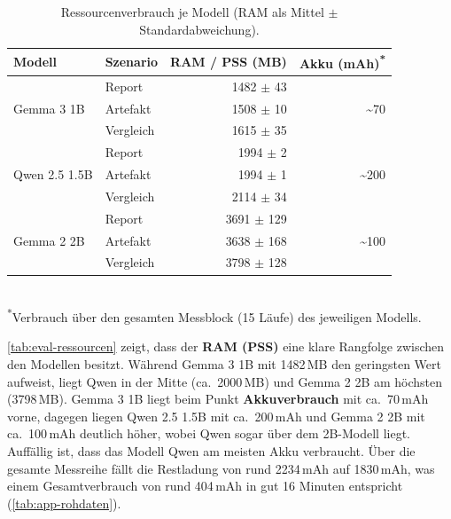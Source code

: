 \begin{table}[H]
    \centering
    \caption{Ressourcenverbrauch je Modell (RAM als Mittel $\pm$ Standardabweichung).}
    \label{tab:eval-ressourcen}
    \begin{tabular}{llrr}
        \toprule
        \textbf{Modell} & \textbf{Szenario} & \textbf{RAM / PSS (MB)} & \textbf{Akku (mAh)\textsuperscript{*}} \\
        \midrule
        \multirow{3}{*}{Gemma 3 1B}
            & Report    & 1482 $\pm$ 43 & \multirow{3}{*}{\textasciitilde70} \\
            & Artefakt  & 1508 $\pm$ 10 & \\
            & Vergleich & 1615 $\pm$ 35 & \\
        \midrule
        \multirow{3}{*}{Qwen 2.5 1.5B}
            & Report    & 1994 $\pm$ 2  & \multirow{3}{*}{\textasciitilde200} \\
            & Artefakt  & 1994 $\pm$ 1  & \\
            & Vergleich & 2114 $\pm$ 34 & \\
        \midrule
        \multirow{3}{*}{Gemma 2 2B}
            & Report    & 3691 $\pm$ 129 & \multirow{3}{*}{\textasciitilde100} \\
            & Artefakt  & 3638 $\pm$ 168 & \\
            & Vergleich & 3798 $\pm$ 128 & \\
        \bottomrule
    \end{tabular}
    \\[4pt]
    \footnotesize\textsuperscript{*}Verbrauch über den gesamten Messblock (15 Läufe) des jeweiligen Modells.
\end{table}

\noindent \autoref{tab:eval-ressourcen} zeigt, dass der \textbf{\ac{RAM} (\ac{PSS})} eine klare Rangfolge zwischen den Modellen besitzt. Während Gemma 3 1B mit 1482\,MB den geringsten Wert aufweist, liegt Qwen in der Mitte (ca.\ 2000\,MB) und Gemma 2 2B am höchsten (3798\,MB).
Gemma 3 1B liegt beim Punkt \textbf{Akkuverbrauch} mit ca.\ 70\,mAh vorne, dagegen liegen Qwen 2.5 1.5B mit ca.\ 200\,mAh und Gemma 2 2B mit ca.\ 100\,mAh deutlich höher, wobei Qwen sogar über dem 2B-Modell liegt.
Auffällig ist, dass das Modell Qwen am meisten Akku verbraucht. Über die gesamte Messreihe fällt die Restladung von rund 2234\,mAh auf 1830\,mAh, was einem Gesamtverbrauch von rund 404\,mAh in gut 16 Minuten entspricht (\autoref{tab:app-rohdaten}).
\vspace{\baselineskip}
\newpage

